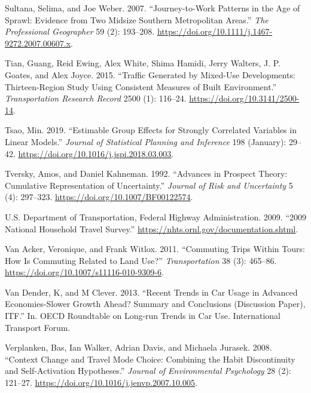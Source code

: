 \documentclass[
  11pt,
  openany]{memoir}
\newlength{\cslhangindent}
\newlength{\cslentryspacingunit} %
\newenvironment{CSLReferences}[2] %
 {%
  \setlength{\parindent}{0pt}
  \ifodd #1
  \let\oldpar\par
  \def\par{\hangindent=\cslhangindent\oldpar}
  \fi
  \setlength{\parskip}{#2\cslentryspacingunit}
 }%
 {}
\begin{document}
\begin{CSLReferences}{1}{0}
\leavevmode{}%
Sultana, Selima, and Joe Weber. 2007. {``Journey-to-{Work Patterns} in the {Age} of {Sprawl}: Evidence from {Two Midsize Southern Metropolitan Areas}.''} \emph{The Professional Geographer} 59 (2): 193--208. \url{https://doi.org/10.1111/j.1467-9272.2007.00607.x}.

\leavevmode{}%
Tian, Guang, Reid Ewing, Alex White, Shima Hamidi, Jerry Walters, J. P. Goates, and Alex Joyce. 2015. {``Traffic {Generated} by {Mixed}-{Use Developments}: Thirteen-{Region Study Using Consistent Measures} of {Built Environment}.''} \emph{Transportation Research Record} 2500 (1): 116--24. \url{https://doi.org/10.3141/2500-14}.

\leavevmode{}%
Tsao, Min. 2019. {``Estimable Group Effects for Strongly Correlated Variables in Linear Models.''} \emph{Journal of Statistical Planning and Inference} 198 (January): 29--42. \url{https://doi.org/10.1016/j.jspi.2018.03.003}.

\leavevmode{}%
Tversky, Amos, and Daniel Kahneman. 1992. {``Advances in Prospect Theory: Cumulative Representation of Uncertainty.''} \emph{Journal of Risk and Uncertainty} 5 (4): 297--323. \url{https://doi.org/10.1007/BF00122574}.

\leavevmode{}%
U.S. Department of Transportation, Federal Highway Administration. 2009. {``2009 {National Household Travel Survey}.''} \url{https://nhts.ornl.gov/documentation.shtml}.

\leavevmode{}%
Van Acker, Veronique, and Frank Witlox. 2011. {``Commuting Trips Within Tours: How Is Commuting Related to Land Use?''} \emph{Transportation} 38 (3): 465--86. \url{https://doi.org/10.1007/s11116-010-9309-6}.

\leavevmode{}%
Van Dender, K, and M Clever. 2013. {``Recent Trends in Car Usage in Advanced Economies-Slower Growth Ahead? Summary and Conclusions (Discussion Paper), ITF.''} In. OECD Roundtable on Long-run Trends in Car Use. International Transport Forum.

\leavevmode{}%
Verplanken, Bas, Ian Walker, Adrian Davis, and Michaela Jurasek. 2008. {``Context Change and Travel Mode Choice: Combining the Habit Discontinuity and Self-Activation Hypotheses.''} \emph{Journal of Environmental Psychology} 28 (2): 121--27. \url{https://doi.org/10.1016/j.jenvp.2007.10.005}.


\end{CSLReferences}
\end{document}
